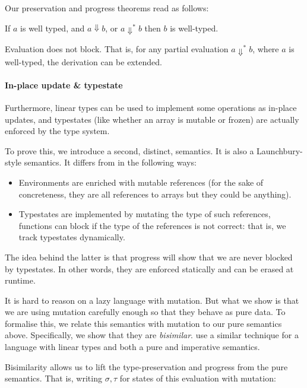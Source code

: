 \documentclass[acmsmall,screen]{acmart}\settopmatter{}
\def\longversion{}
\begin{document}
Our preservation and progress theorems
%
\ifx\longversion{}
\fi
read as follows:

\begin{theorem}\label{thm:type-safety}
  If $a$ is well typed, and $a⇓b$, or $a⇓^*b$ then $b$ is well-typed.
\end{theorem}
\begin{theorem}[Progress]\label{thm:progress-denotational}
  Evaluation does not block. That is, for any partial evaluation
  $a⇓^*b$, where $a$ is well-typed, the derivation can be extended.
\end{theorem}

\paragraph{In-place update \& typestate}
Furthermore, linear types can be
used to implement some operations as in-place updates, and
typestates (like whether an array is mutable or frozen) are actually
enforced by the type system.

To prove this, we introduce a second, distinct, semantics. It is also
a Launchbury-style semantics. It differs from \citet{launchbury_natural_1993} in the following ways:
\begin{itemize}
\item Environments are enriched with mutable references (for the sake
  of concreteness, they are all references to arrays but they could be
  anything).
\item Typestates are implemented by mutating the type of such
  references, functions can block if the type of the references is not
  correct: that is, we track typestates dynamically.
\end{itemize}
The idea behind the latter is that progress will show that we are
never blocked by typestates. In other words, they are enforced
statically and can be erased at runtime.

It is hard to reason on a lazy language with mutation. But what we
show is that we are using mutation carefully enough so that
they behave as pure data. To formalise this, we relate this
semantics with mutation to our pure semantics above. Specifically, we
show that they are \emph{bisimilar}.
\citet{amani_cogent_2016} use a similar technique for a language with linear types
and both a pure and imperative semantics.

Bisimilarity allows us to lift the type-preservation and
progress from the pure semantics. That is, writing $σ,τ$ for states of
this evaluation with mutation:
\end{document}
